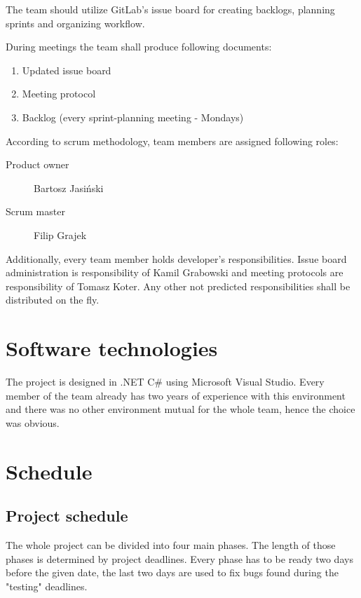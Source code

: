 \documentclass[11pt,a4paper]{article}
\begin{document}
The team should utilize GitLab's issue board for creating backlogs, planning sprints and organizing workflow.

During meetings the team shall produce following documents:

\begin{enumerate}
\item Updated issue board
\item Meeting protocol
\item Backlog (every sprint-planning meeting - Mondays)
\end{enumerate}

According to scrum methodology, team members are assigned following roles:

\begin{description}
\item[Product owner] Bartosz Jasiński
\item[Scrum master] Filip Grajek
\end{description}

Additionally, every team member holds developer's responsibilities. Issue board administration is responsibility of Kamil Grabowski and meeting protocols are responsibility of Tomasz Koter. Any other not predicted responsibilities shall be distributed on the fly.


\section{Software technologies}
The project is designed in .NET C\# using Microsoft Visual Studio. Every member of the team already has two years of experience with this environment and there was no other environment mutual for the whole team, hence the choice was obvious.



\section{Schedule}
\subsection{Project schedule}

The whole project can be divided into four main phases. The length of those phases is determined by project deadlines. Every phase has to be ready two days before the given date, the last two days are used to fix bugs found during the "testing" deadlines. \\
\end{document}
